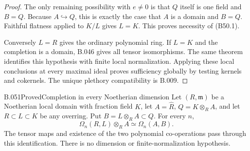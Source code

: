 \begin{proof}
The only remaining possibility with $e\ne0$ is
that $Q$ itself is one field and $B=Q$.
Because $A\hookrightarrow Q$, this is exactly
the case that $A$ is a domain and $B=Q$.
Faithful flatness applied to $K/L$ gives $L=K$.
This proves necessity of (B50.1).

Conversely $L=R$ gives the ordinary polynomial ring.
If $L=K$ and the completion is a domain, B.046
gives all tensor isomorphisms. The same theorem
identifies this hypothesis with finite local
normalization. Applying these local conclusions
at every maximal ideal proves sufficiency globally
by testing kernels and cokernels. The unique
plethory compatibility is B.009.
\end{proof}

\begin{saresult}{B.051}{Proved}{Completion in every Noetherian dimension}
Let $(R,\mathfrak m)$ be a Noetherian local domain with
fraction field $K$, let $A=\widehat R$, $Q=K\otimes_R A$,
and let $R\subset L\subset K$ be any overring.
Put $B=L\otimes_R A\subset Q$. For every $n$,
\[
                    \Omega_n(R,L)\otimes_R A
                         \simeq\Omega_n(A,B).              \tag{B51.1}
\]
The tensor maps and existence of the two polynomial
co-operations pass through this identification. There is
no dimension or finite-normalization hypothesis.
\end{saresult}
